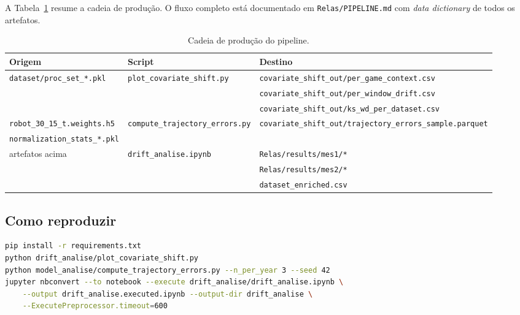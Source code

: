 \documentclass[11pt,a4paper]{article}
\begin{document}
A Tabela~\ref{tab:pipeline} resume a cadeia de produ\c{c}\~ao. O fluxo
completo est\'a documentado em \texttt{Relas/PIPELINE.md} com
\emph{data dictionary} de todos os artefatos.

\begin{table}[h]
\centering
\small
\begin{tabular}{lll}
\toprule
\textbf{Origem} & \textbf{Script} & \textbf{Destino} \\
\midrule
\texttt{dataset/proc\_set\_*.pkl} & \texttt{plot\_covariate\_shift.py} &
   \texttt{covariate\_shift\_out/per\_game\_context.csv} \\
                                  &                                    &
   \texttt{covariate\_shift\_out/per\_window\_drift.csv} \\
                                  &                                    &
   \texttt{covariate\_shift\_out/ks\_wd\_per\_dataset.csv} \\
\midrule
\texttt{robot\_30\_15\_t.weights.h5} & \texttt{compute\_trajectory\_errors.py} &
   \texttt{covariate\_shift\_out/trajectory\_errors\_sample.parquet} \\
\texttt{normalization\_stats\_*.pkl} &                                  & \\
\midrule
artefatos acima                  & \texttt{drift\_analise.ipynb} &
   \texttt{Relas/results/mes1/*} \\
                                  &                                    &
   \texttt{Relas/results/mes2/*} \\
                                  &                                    &
   \texttt{dataset\_enriched.csv} \\
\bottomrule
\end{tabular}
\caption{Cadeia de produ\c{c}\~ao do pipeline.}
\label{tab:pipeline}
\end{table}

\subsection{Como reproduzir}

\begin{lstlisting}[language=bash]
pip install -r requirements.txt
python drift_analise/plot_covariate_shift.py
python model_analise/compute_trajectory_errors.py --n_per_year 3 --seed 42
jupyter nbconvert --to notebook --execute drift_analise/drift_analise.ipynb \
    --output drift_analise.executed.ipynb --output-dir drift_analise \
    --ExecutePreprocessor.timeout=600
\end{lstlisting}
\end{document}
